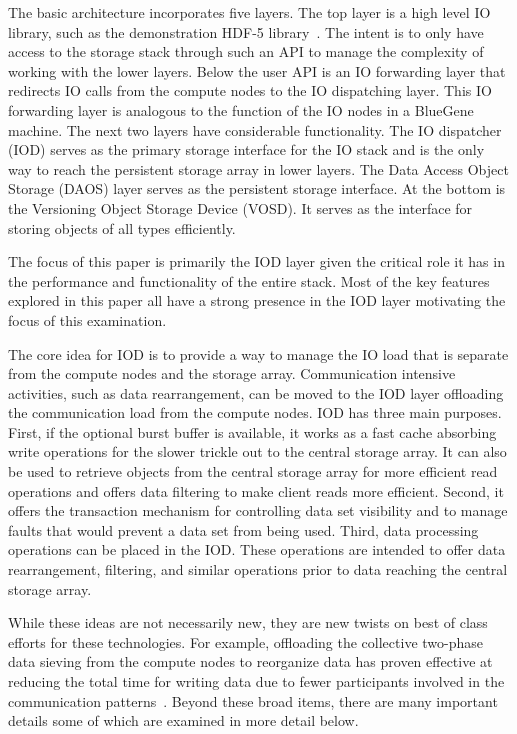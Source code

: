 \documentclass[conference]{IEEEtran}
\begin{document}
The basic architecture incorporates five layers. The top layer is a high level
IO library, such as the demonstration HDF-5 library~\cite{hdf5}. The intent is to only have
access to the storage stack through such an API to manage the complexity of
working with the lower layers. Below the user API is an IO forwarding layer
that redirects IO calls from the compute nodes to the IO dispatching layer.
This IO forwarding layer is analogous to the function of the IO nodes in a
BlueGene machine. The next two layers have considerable functionality. The IO
dispatcher (IOD) serves as the primary storage interface for the IO stack and
is the only way to reach the persistent storage array in lower layers. The
Data Access Object Storage (DAOS) layer serves as the persistent storage
interface. At the bottom is the Versioning Object Storage Device (VOSD). It
serves as the interface for storing objects of all types efficiently.

The focus of this paper is primarily the IOD layer given the critical role it
has in the performance and functionality of the entire stack. Most of the key
features explored in this paper all have a strong presence in the IOD layer
motivating the focus of this examination.

The core idea for IOD is to provide a way to manage the IO load that is
separate from the compute nodes and the storage array. Communication intensive
activities, such as data rearrangement, can be moved to the IOD layer
offloading the communication load from the compute nodes. IOD has three main
purposes. First, if the optional burst buffer is available, it works as a fast
cache absorbing write operations for the slower trickle out to the central
storage array. It can also be used to retrieve objects from the central storage
array for more efficient read operations and offers data filtering to make
client reads more efficient.  Second, it offers the transaction mechanism for
controlling data set visibility and to manage faults that would prevent a data
set from being used. Third, data processing operations can be placed in the
IOD. These operations are intended to offer data rearrangement, filtering, and
similar operations prior to data reaching the central storage array.

While these ideas are not necessarily new, they are new twists on best of class
efforts for these technologies. For example, offloading the collective
two-phase data sieving from the compute nodes to reorganize data has proven
effective at reducing the total time for writing data due to fewer participants
involved in the communication patterns~\cite{lofstead:2011:nessie-staging}.
Beyond these broad items, there are many important details some of which are
examined in more detail below.
\end{document}

